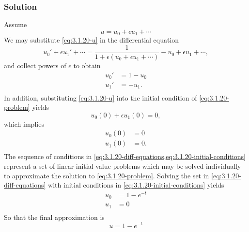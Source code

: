 \documentclass[12pt]{article}
\begin{document}
\subsubsection*{Solution}
Assume
\begin{equation}
  \label{eq:3.1.20-u}
  u = u_0 + \epsilon u_1 + \cdots
\end{equation}
We may substitute \cref{eq:3.1.20-u} in the differential equation
\begin{equation*}
  u_0'+\epsilon u_1'+\cdots = \frac{1}{1+\epsilon(u_0+\epsilon u_1+\cdots)}
  - u_0+\epsilon u_1+\cdots,
\end{equation*}
and collect powers of $\epsilon$ to obtain
\begin{equation}
  \begin{aligned}
    \label{eq:3.1.20-diff-equations}
    u_0' &= 1-u_0 \\
    u_1' &= -u_1. \\
  \end{aligned}
\end{equation}
In addition, substituting \cref{eq:3.1.20-u} into the initial condition of
\cref{eq:3.1.20-problem} yields
\begin{equation*}
  u_0(0)+\epsilon u_1(0) = 0,
\end{equation*}
which implies
\begin{equation}
  \label{eq:3.1.20-initial-conditions}
  \begin{aligned}
    u_0(0) &= 0 \\
    u_1(0) &= 0. \\
  \end{aligned}
\end{equation}
The sequence of conditions in
\cref{eq:3.1.20-diff-equations,eq:3.1.20-initial-conditions} represent a set of
linear initial value problems which may be solved individually to approximate
the solution to \cref{eq:3.1.20-problem}. Solving the set in
\cref{eq:3.1.20-diff-equations} with initial conditions in
\cref{eq:3.1.20-initial-conditions} yields
\begin{equation*}
  \begin{aligned}
    u_0 &= 1-e^{-t} \\
    u_1 &= 0 \\
  \end{aligned}
\end{equation*}
So that the final approximation is
\begin{equation*}
  \boxed{
    u = 1-e^{-t}
  }
\end{equation*}
\end{document}
